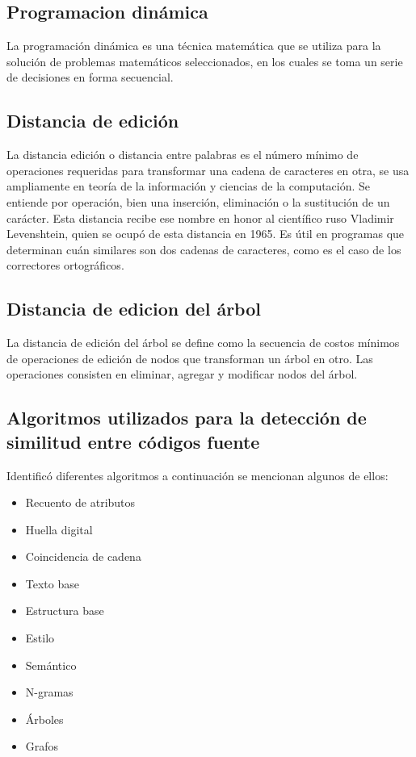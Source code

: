 \subsection{Programacion dinámica}
La programación dinámica es una técnica matemática que se utiliza para la solución de problemas matemáticos seleccionados, en los cuales se toma un serie de decisiones en forma secuencial.

\subsection{Distancia de edición}
La distancia edición o distancia entre palabras es el número mínimo de operaciones requeridas para transformar una cadena de caracteres en otra, se usa ampliamente en teoría de la información y ciencias de la computación. Se entiende por operación, bien una inserción, eliminación o la sustitución de un carácter. Esta distancia recibe ese nombre en honor al científico ruso Vladimir Levenshtein, quien se ocupó de esta distancia en 1965. Es útil en programas que determinan cuán similares son dos cadenas de caracteres, como es el caso de los correctores ortográficos.

\subsection{Distancia de edicion del árbol}
La distancia de edición del árbol se define como la secuencia de costos mínimos de operaciones de edición de nodos que transforman un árbol en otro. Las operaciones consisten en eliminar, agregar y modificar nodos del árbol.

\subsection{Algoritmos utilizados para la detección de similitud entre códigos fuente}
\cite{10.1145/3313290} Identificó diferentes algoritmos a continuación se mencionan algunos de ellos:

\begin{itemize}
    \item Recuento de atributos
    \item Huella digital
    \item Coincidencia de cadena
    \item Texto base
    \item Estructura base
    \item Estilo
    \item Semántico
    \item N-gramas
    \item Árboles
    \item Grafos
\end{itemize}

